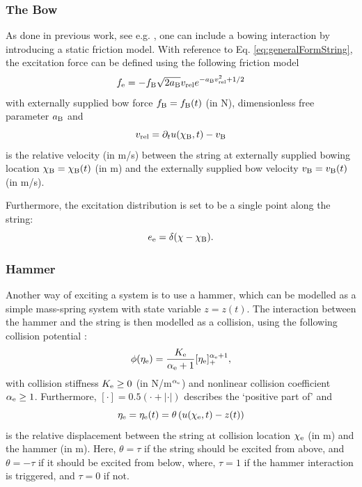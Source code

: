 \documentclass{article}
\begin{document}
\subsubsection{The Bow}
As done in previous work, see e.g. \cite{Willemsen2019}, one can include a bowing interaction by introducing a static friction model. With reference to Eq. \eqref{eq:generalFormString}, the excitation force can be defined using the following friction model \cite{theBible}
\begin{equation}\label{eq:bowForce}
    f_\text{e} = - f_{\text{B}}\sqrt{2a_{\text{B}}}v_\text{rel} e^{-a_{\text{B}}v_\text{rel}^2+1/2} 
\end{equation}
with externally supplied bow force $f_{\text{B}} = f_{\text{B}}(t)$ (in N), dimensionless free parameter $a_{\text{B}}$ and 
\begin{equation}\label{eq:vrel}
    v_\text{rel} = \partial_t u(\chi_{\text{B}}, t) - v_{\text{B}}
\end{equation}
is the relative velocity (in m/s) between the string at externally supplied bowing location $\chi_{\text{B}} = \chi_{\text{B}}(t)$ (in m) and the externally supplied bow velocity $v_{\text{B}} = v_{\text{B}}(t)$ (in m/s).

Furthermore, the excitation distribution is set to be a single point along the string:
\begin{equation}\label{eq:bowDistribution}
    e_\text{e} = \delta(\chi - \chi_{\text{B}}).
\end{equation}

\subsubsection{Hammer}
Another way of exciting a system is to use a hammer, which can be modelled as a simple mass-spring system with state variable $z=z(t)$. The interaction between the hammer and the string is then modelled as a collision, using the following collision potential \cite{Hertz1881}:
\begin{equation}\label{eq:potential}
    \phi(\eta_{\text{e}}) = \frac{K_{\text{e}}}{\alpha_{\text{e}}+1}[\eta_{\text{e}}]_+^{\alpha_{\text{e}}+1},
\end{equation}
with collision stiffness $K_{\text{e}} \geq 0$ (in N/m$^{\alpha_{\text{e}}}$) and nonlinear collision coefficient $\alpha_{\text{e}} \geq 1$. Furthermore, $[\cdot] = 0.5 (\cdot + |\cdot|)$ describes the `positive part of' and
\begin{equation}
    \eta_{\text{e}} = \eta_{\text{e}}(t) = \theta\left(u(\chi_{\text{e}}, t) - z(t)\right)
\end{equation}
is the relative displacement between the string at collision location $\chi_{\text{e}}$ (in m) and the hammer (in m). Here, $\theta = \tau$ if the string should be excited from above, and $\theta = -\tau$ if it should be excited from below, where, $\tau = 1$ if the hammer interaction is triggered, and $\tau = 0$ if not.  
\end{document}

